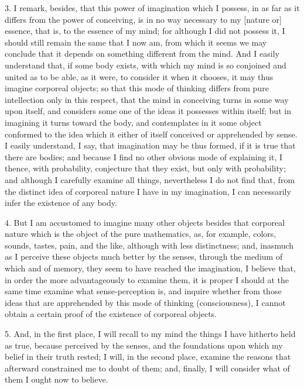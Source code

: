 3. I remark, besides, that this power of imagination which I possess, in as far as it differs from the power of conceiving, is in no way necessary to my [nature or] essence, that is, to the essence of my mind; for although I did not possess it, I should still remain the same that I now am, from which it seems we may conclude that it depends on something different from the mind. And I easily understand that, if some body exists, with which my mind is so conjoined and united as to be able, as it were, to consider it when it chooses, it may thus imagine corporeal objects; so that this mode of thinking differs from pure intellection only in this respect, that the mind in conceiving turns in some way upon itself, and considers some one of the ideas it possesses within itself; but in imagining it turns toward the body, and contemplates in it some object conformed to the idea which it either of itself conceived or apprehended by sense. I easily understand, I say, that imagination may be thus formed, if it is true that there are bodies; and because I find no other obvious mode of explaining it, I thence, with probability, conjecture that they exist, but only with probability; and although I carefully examine all things, nevertheless I do not find that, from the distinct idea of corporeal nature I have in my imagination, I can necessarily infer the existence of any body.

4. But I am accustomed to imagine many other objects besides that corporeal nature which is the object of the pure mathematics, as, for example, colors, sounds, tastes, pain, and the like, although with less distinctness; and, inasmuch as I perceive these objects much better by the senses, through the medium of which and of memory, they seem to have reached the imagination, I believe that, in order the more advantageously to examine them, it is proper I should at the same time examine what sense-perception is, and inquire whether from those ideas that are apprehended by this mode of thinking (consciousness), I cannot obtain a certain proof of the existence of corporeal objects.

5. And, in the first place, I will recall to my mind the things I have hitherto held as true, because perceived by the senses, and the foundations upon which my belief in their truth rested; I will, in the second place, examine the reasons that afterward constrained me to doubt of them; and, finally, I will consider what of them I ought now to believe.

